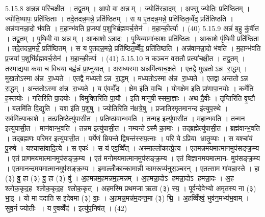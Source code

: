 5.15.8
अन्न॒न्न परि॑चक्षीत । तद्व्र॒तम् । आपो॒ वा अन्नम् । ज्योति॑रन्ना॒दम् । अ॒फ्सु ज्योतिः॒ प्रति॑ष्ठितम् । ज्योति॒ष्यापः॒ प्रति॑ष्ठिताः । तदे॒तदन्न॒मन्ने॒ प्रति॑ष्ठितम् । स य ए॒तदन्न॒मन्ने॒ प्रति॑ष्ठित॒व्वेँद॒ प्रति॑तिष्ठति । अन्न॑वानन्ना॒दो भ॑वति । म॒हान्भ॑वति प्र॒जया॑ प॒शुभि॑र्ब्रह्मवर्च॒सेन॑ । म॒हान्की॒र्त्या । (40)
5.15.9
अन्नं॑ ब॒हु कु॑र्वीत । तद्व्र॒तम् । पृ॒थि॒वी वा अन्नम् । आ॒का॒शोऽन्ना॒दः । पृ॒थि॒व्यामा॑का॒शः प्रति॑ष्ठितः । आ॒का॒शे पृ॑थि॒वी प्रति॑ष्ठिता । तदे॒तदन्न॒मन्ने॒ प्रति॑ष्ठितम् । स य ए॒तदन्न॒मन्ने॒ प्रति॑ष्ठित॒व्वेँद॒ प्रति॑तिष्ठति । अन्न॑वानन्ना॒दो भ॑वति । म॒हान्भ॑वति प्र॒जया॑ प॒शुभि॑र्ब्रह्मवर्च॒सेन॑ । म॒हान्की॒र्त्या । (41)
5.15.10
न कञ्चन वसतौ प्रत्या॑चक्षी॒त । तद्व्र॒तम् । तस्माद्यया कया च विधया बह्व॑न्नं प्रा॒प्नुयात् । अराध्यस्मा अन्नमि॑त्याच॒क्षते । एतद्वै मुखतोऽन्न रा॒द्धम् । मुखतोऽस्मा अ॑न्न रा॒ध्यते । एतद्वै मध्यतोऽन्न रा॒द्धम् । मध्यतोऽस्मा अ॑न्न रा॒ध्यते । एतद्वा अन्ततोऽन्न रा॒द्धम् । अन्ततोऽस्मा अ॑न्न रा॒ध्यते । य ए॑वव्वेँ॒द । क्षेम इ॑ति वा॒चि । योगक्षेम इति प्रा॑णापा॒नयोः । कर्मे॑ति ह॒स्तयोः । गतिरि॑ति पा॒दयोः । विमुक्तिरि॑ति पा॒यौ । इति मानुषीस्समा॒ज्ञाः । अथ दै॒वीः । तृप्तिरि॑ति वृ॒ष्टौ । बलमि॑ति वि॒द्युति । यश इ॑ति प॒शुषु । ज्योतिरिति न॑क्षत्रे॒षु । प्रजातिरमृतमानन्द इ॑त्युप॒स्थे । सर्वमि॑त्याका॒शे । तत्प्रतिष्ठेत्यु॑पासी॒त । प्रतिष्ठा॑वान्भ॒वति । तन्मह इत्यु॑पासी॒त । म॑हान्भ॒वति । तन्मन इत्यु॑पासी॒त । मान॑वान्भ॒वति । तन्नम इत्यु॑पासी॒त । नम्यन्तेऽस्मै का॒माः । तद्ब्रह्मेत्यु॑पासी॒त । ब्रह्म॑वान्भ॒वति । तद्ब्रह्मणः परिमर इत्यु॑पासी॒त । पर्येणं म्रियन्ते द्विषन्त॑स्सप॒त्नाः । परि येऽप्रिया भ्रातृ॒व्याः । स यश्चा॑यं पु॒रुषे । यश्चासा॑वादि॒त्ये । स एकः॑ । स य॑ एव॒व्विँत् । अस्माल्लो॑कात्प्रे॒त्य । एतमन्नमयमात्मानमुप॑सङ्क्र॒म्य । एतं प्राणमयमात्मानमुप॑सङ्क्र॒म्य । एतं मनोमयमात्मानमुप॑सङ्क्र॒म्य । एतं विज्ञानमयमात्मान- मुप॑सङ्क्र॒म्य । एतमानन्दमयमात्मानमुप॑सङ्क्र॒म्य । इमाल्लोँकान्कामान्नी कामरूप्य॑नुस॒ञ्चरन् । एतत्साम गा॑यन्ना॒स्ते । हा (३) वु॒ हा (३) वु॒ हा (३) वु॑ । अ॒हमन्नम॒हमन्नम॒हमन्नम् । अ॒हमन्ना॒दोऽ हमन्ना॒दोऽ हमन्ना॒दः । अ॒ह श्लोक॒कृद॒ह श्लोक॒कृद॒ह श्लोक॒कृत् । अहमस्मि प्रथमजा ऋता (३) स्य॒ । पूर्वन्देवेभ्यो अमृतस्य ना (३) भा॒इ॒ । यो मा ददाति स इदेवमा (३) वाः॒ । अ॒हमन्न॒मन्न॑म॒दन्त॒मा (३) द्मि॒ । अ॒हव्विँश्वं॒ भुव॑न॒मभ्य॑भ॒वाम् । सुव॒र्न ज्योतीः । य ए॒वव्वेँद॑ । इत्यु॑प॒निष॑त् । (42)

